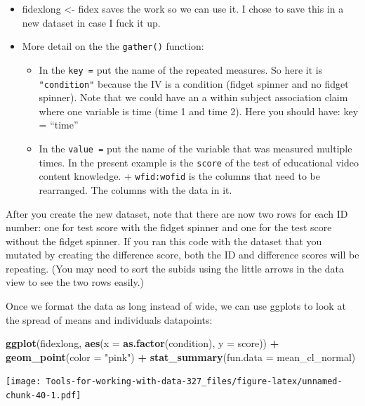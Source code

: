 \documentclass[
]{book}
\newenvironment{Shaded}{\begin{snugshade}}{\end{snugshade}}
\newcommand{\DataTypeTok}[1]{\textcolor[rgb]{0.13,0.29,0.53}{#1}}
\newcommand{\KeywordTok}[1]{\textcolor[rgb]{0.13,0.29,0.53}{\textbf{#1}}}
\newcommand{\NormalTok}[1]{#1}
\newcommand{\OperatorTok}[1]{\textcolor[rgb]{0.81,0.36,0.00}{\textbf{#1}}}
\newcommand{\StringTok}[1]{\textcolor[rgb]{0.31,0.60,0.02}{#1}}
\providecommand{\tightlist}{%
  \setlength{\itemsep}{0pt}\setlength{\parskip}{0pt}}
\begin{document}
\begin{itemize}
\tightlist
\item
  fidexlong \textless- fidex saves the work so we can use it. I chose to save this in a new dataset in case I fuck it up.\\
\item
  More detail on the the \texttt{gather()} function:

  \begin{itemize}
  \tightlist
  \item
    In the \texttt{key\ =} put the name of the repeated measures. So here it is \texttt{"condition"} because the IV is a condition (fidget spinner and no fidget spinner). Note that we could have an a within subject association claim where one variable is time (time 1 and time 2). Here you should have: key = ``time''\\
  \item
    In the \texttt{value\ =} put the name of the variable that was measured multiple times. In the present example is the \texttt{score} of the test of educational video content knowledge. + \texttt{wfid:wofid} is the columns that need to be rearranged. The columns with the data in it.
  \end{itemize}
\end{itemize}

After you create the new dataset, note that there are now two rows for each ID number: one for test score with the fidget spinner and one for the test score without the fidget spinner. If you ran this code with the dataset that you mutated by creating the difference score, both the ID and difference scores will be repeating. (You may need to sort the subids using the little arrows in the data view to see the two rows easily.)

Once we format the data as long instead of wide, we can use ggplots to look at the spread of means and individuals datapoints:

\begin{Shaded}
\begin{Highlighting}[]
\KeywordTok{ggplot}\NormalTok{(fidexlong, }\KeywordTok{aes}\NormalTok{(}\DataTypeTok{x =} \KeywordTok{as.factor}\NormalTok{(condition), }\DataTypeTok{y =}\NormalTok{ score)) }\OperatorTok{+}
\StringTok{  }\KeywordTok{geom_point}\NormalTok{(}\DataTypeTok{color =} \StringTok{"pink"}\NormalTok{) }\OperatorTok{+}
\StringTok{  }\KeywordTok{stat_summary}\NormalTok{(}\DataTypeTok{fun.data =}\NormalTok{ mean_cl_normal)}
\end{Highlighting}
\end{Shaded}

\texttt{[image: Tools-for-working-with-data-327\_files/figure-latex/unnamed-chunk-40-1.pdf]}

  
\end{document}
